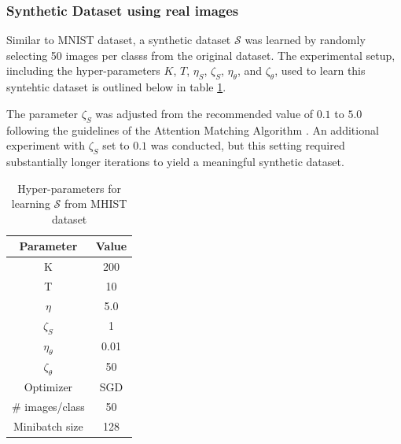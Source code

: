 \documentclass[conference, compsoc]{IEEEtran}
\begin{document}
	\subsubsection{Synthetic Dataset using real images} \hfill
	
	Similar to MNIST dataset, a synthetic dataset $\mathcal{S}$ was learned by randomly selecting 50 images per classs from the original dataset. The experimental setup, iincluding the hyper-parameters $K$, $T$, $\eta_S$, $\zeta_S$, $\eta_{\theta}$, and $\zeta_{\theta}$, used to learn this syntehtic dataset is outlined below in table \ref{table:parameters_mhist}.
	
	The parameter $\zeta_S$ was adjusted from the recommended value of $0.1$ to $5.0$ following the guidelines of the Attention Matching Algorithm \cite{sajedi2023datadamefficientdatasetdistillation}. An additional experiment with $\zeta_S$ set to $0.1$ was conducted, but this setting required substantially longer iterations to yield a meaningful synthetic dataset.
	
	\begin{table}[H]
	\centering
	\caption{Hyper-parameters for learning $\mathcal{S}$ from MHIST dataset}
	\begin{tabular}{|c|c|}
		\hline
		\textbf{Parameter} & \textbf{Value} \\ \hline
		K & 200 \\ \hline
		T & 10 \\ \hline
		$\eta$ & 5.0 \\ \hline
		$\zeta_S$ & 1 \\ \hline
		$\eta_{\theta}$ & 0.01 \\ \hline
		$\zeta_{\theta}$ & 50 \\ \hline
		Optimizer & SGD \\ \hline
		\# images/class & 50 \\ \hline
		Minibatch size & 128 \\ \hline
	\end{tabular}
	\label{table:parameters_mhist}
	\end{table}	
\end{document}
